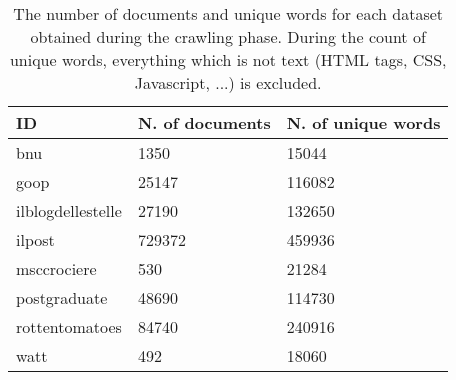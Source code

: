 \begin{table}[H]
    \begin{center}
        \begin{tabular}{ |l|l|l| }
            \hline
            ID                & N. of documents & N. of unique words \\
            \hline
            \hline
            bnu               & 1350            & 15044              \\
            \hline
            goop              & 25147           & 116082             \\
            \hline
            ilblogdellestelle & 27190           & 132650             \\
            \hline
            ilpost            & 729372          & 459936             \\
            \hline
            msccrociere       & 530             & 21284              \\
            \hline
            postgraduate      & 48690           & 114730             \\
            \hline
            rottentomatoes    & 84740           & 240916             \\
            \hline
            watt              & 492             & 18060              \\
            \hline
        \end{tabular}
    \end{center}
    \caption{
        The number of documents and unique words for each dataset obtained during the crawling phase.
        During the count of unique words, everything which is not text (HTML tags, CSS, Javascript, ...) is excluded.
    }
    \label{table:dbdata}
\end{table}